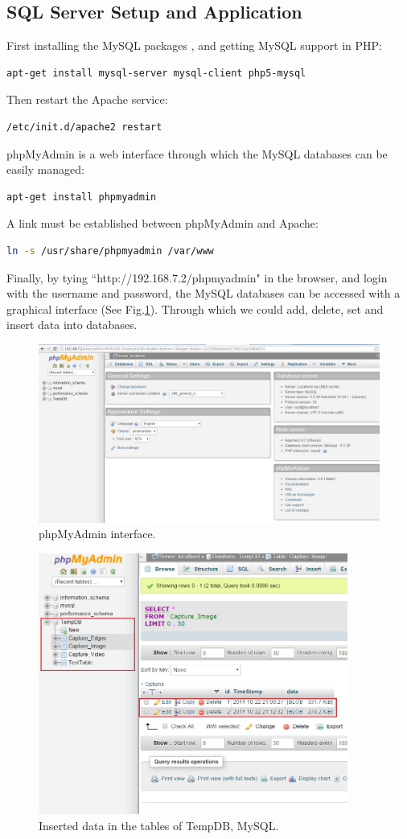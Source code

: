 \documentclass[12pt,journal,draftclsnofoot,onecolumn]{IEEEtran}
\begin{document}
\subsection{SQL Server Setup and Application}\label{Sql}
First installing the MySQL packages , and getting MySQL support in PHP:
\begin{lstlisting}[language={bash}]
apt-get install mysql-server mysql-client php5-mysql
\end{lstlisting}
Then restart the Apache service:
\begin{lstlisting}[language={bash}]
/etc/init.d/apache2 restart
\end{lstlisting}
phpMyAdmin is a web interface through which the MySQL databases can be easily managed:
\begin{lstlisting}[language={bash}]
apt-get install phpmyadmin
\end{lstlisting}
A link must be established between phpMyAdmin and Apache:
\begin{lstlisting}[language={bash}]
ln -s /usr/share/phpmyadmin /var/www
\end{lstlisting}
Finally, by tying ``http://192.168.7.2/phpmyadmin" in the browser, and login with the username and password, the MySQL databases can be accessed with a graphical interface (See Fig.\ref{sql1}). Through which we could add, delete, set and insert data into databases.
\begin{figure}[ht]
	\centering
	\includegraphics[width=4.5in]{./figs/sql1.jpg}
	\caption{phpMyAdmin interface.}
	\label{sql1}
\end{figure}
\begin{figure}[ht]
	\centering
	\includegraphics[width=4in]{./figs/sql2.jpg}
	\caption{Inserted data in the tables of TempDB, MySQL.}
	\label{sql2}
\end{figure}
\end{document}
